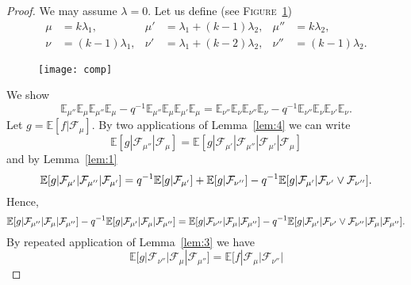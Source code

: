 \documentclass[a4paper]{amsart}
\newcommand{\EE}{\mathbb{E}}
\theoremstyle{plain}
\theoremstyle{definition}
\theoremstyle{remark}
\numberwithin{equation}{section}
\theoremstyle{plain}
\begin{document}
\begin{proof}
  We may assume $\lambda = 0$. Let us define (see
  {\textsc{Figure~\ref{fig:5}}})
  \begin{align*}
    \mu &= k \lambda_1, 
    &\mu' &= \lambda_1 + (k-1) \lambda_2, 
    &\mu'' &= k \lambda_2,\\
    \nu &= (k-1) \lambda_1, 
    &\nu' &= \lambda_1 + (k-2) \lambda_2, 
    &\nu'' &= (k-1)\lambda_2.
  \end{align*}
  \begin{figure}[h]
    \texttt{[image: comp]}
    \caption{}
    \label{fig:5}
  \end{figure}
  We show
  \begin{equation}
    \label{eq:8}
    \EE_{\mu''} \EE_{\mu} \EE_{\mu''} \EE_{\mu} 
    - q^{-1} \EE_{\mu''} \EE_{\mu} \EE_{\mu'} \EE_{\mu}
    =
    \EE_{\nu''} \EE_{\nu} \EE_{\nu''} \EE_{\nu} 
    - q^{-1} \EE_{\nu''} \EE_{\nu} \EE_{\nu'} \EE_{\nu}.
  \end{equation}
  Let $g = \EE[f| \mathcal{F}_{\mu}]$. By two applications of
  Lemma~\ref{lem:4} we can write
  \begin{equation*}
    \EE[g | \mathcal{F}_{\mu''} | \mathcal{F}_{\mu}]
    =\EE[g | \mathcal{F}_{\mu'} | \mathcal{F}_{\mu''} | \mathcal{F}_{\mu'} 
    | \mathcal{F}_{\mu}]
  \end{equation*}
  and by Lemma~\ref{lem:1}
  \begin{equation*}
    \EE[g | \mathcal{F}_{\mu'} | \mathcal{F}_{\mu''} | \mathcal{F}_{\mu'}]
      =q^{-1} \EE[g | \mathcal{F}_{\mu'}] 
      + \EE[g | \mathcal{F}_{\nu''}]\\
      - q^{-1} \EE[g |\mathcal{F}_{\mu'} | \mathcal{F}_{\nu'} \vee
      \mathcal{F}_{\nu''}]. 
  \end{equation*}
  Hence, 
  \begin{equation*}
  \EE[g | \mathcal{F}_{\mu''} | \mathcal{F}_{\mu} | \mathcal{F}_{\mu''}]
    -q^{-1} \EE[g | \mathcal{F}_{\mu'} | \mathcal{F}_{\mu} 
    | \mathcal{F}_{\mu''}]\\
    =\EE[g | \mathcal{F}_{\nu''} | \mathcal{F}_{\mu} | \mathcal{F}_{\mu''}]
      -q^{-1} \EE[g  | \mathcal{F}_{\mu'} | \mathcal{F}_{\nu'} \vee
        \mathcal{F}_{\nu''} |\mathcal{F}_{\mu} | \mathcal{F}_{\mu''}].
  \end{equation*}
  By repeated application of Lemma~\ref{lem:3} we have
  \begin{equation*}
    \EE[g | \mathcal{F}_{\nu''} | \mathcal{F}_{\mu} |
      \mathcal{F}_{\mu''}]
    =\EE[f | \mathcal{F}_{\mu} | \mathcal{F}_{\nu''} |

\end{equation*}
\end{proof}
\end{document}
